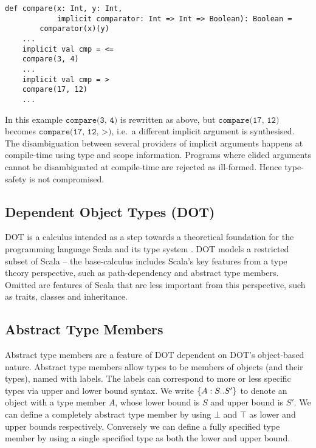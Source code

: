 \begin{minipage}{\linewidth}
\begin{lstlisting}[mathescape]
    def compare(x: Int, y: Int,
            implicit comparator: Int => Int => Boolean): Boolean =
        comparator(x)(y)
    ...
    implicit val cmp = <=
    compare(3, 4)
    ...
    implicit val cmp = >
    compare(17, 12)
    ...
\end{lstlisting}
\end{minipage}

In this example $\texttt{compare(3, 4)}$ is rewritten as above, but
$\texttt{compare(17, 12)}$ becomes $\texttt{compare(17, 12, >)}$, i.e.~a
different implicit argument is synthesised. The disambiguation between several
providers of implicit arguments happens at compile-time using type and scope
information. Programs where elided arguments cannot be disambiguated at
compile-time are rejected as ill-formed. Hence type-safety is not compromised.

\subsection{Dependent Object Types (DOT)}

DOT is a calculus intended as a step towards a theoretical foundation for the
programming language Scala and its type system \cite{AMO12}. DOT models a
restricted subset of Scala -- the base-calculus includes Scala's key features
from a type theory perspective, such as path-dependency and abstract type
members. Omitted are features of Scala that are less important from this
perspective, such as traits, classes and inheritance.

\subsection{Abstract Type Members}

Abstract type members are a feature of DOT dependent on DOT's object-based
nature. Abstract type members allow types to be members of objects (and their
types), named with labels. The labels can correspond to more or less specific
types via upper and lower bound syntax. We write $\{A : S .. S'\}$ to denote an
object with a type member $A$, whose lower bound is $S$ and upper bound is
$S'$. We can define a completely abstract type member by using $\bot$ and
$\top$ as lower and upper bounds respectively. Conversely we can define a fully
specified type member by using a single specified type as both the lower and
upper bound.


